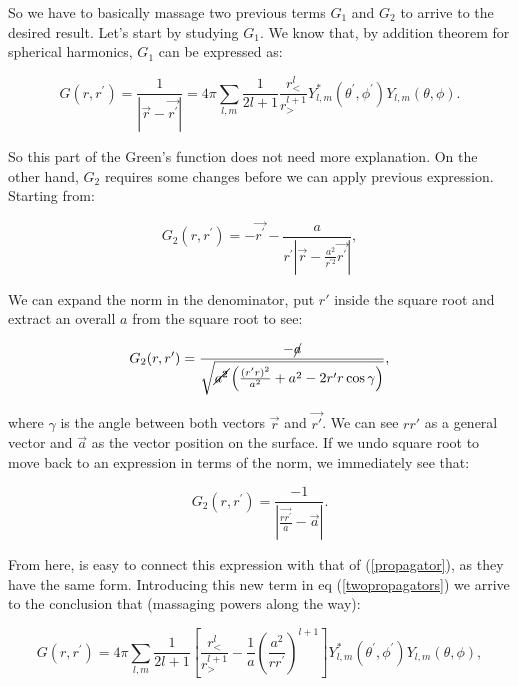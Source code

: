 So we have to basically massage two previous terms $G_{1}$ and $G_{2}$ to arrive to the desired result. Let's start by studying $G_{1}$.  We know that, by addition theorem for spherical harmonics, $G_{1}$ can be expressed as:
	
\begin{equation}\label{propagator}
	G\left(r, r^{\prime}\right) = \frac{1}{\left|\vec{r}-\vec{r^{\prime}}\right|}=4 \pi \sum_{l, m} \frac{1}{2 l+1}\frac{r_{<}^{l}}{r_{>}^{l+1}} Y_{l, m}^{*}\left(\theta^{\prime}, \phi^{\prime}\right) Y_{l, m}(\theta, \phi).
\end{equation}

So this part of the Green's function does not need more explanation. On the other hand, $G_{2}$ requires some changes before we can apply previous expression. Starting from:
	
\begin{equation}
	G_{2} (r, r^{\prime}) = -\vec{r^{\prime}}-\frac{a}{r^{\prime}\left|\vec{r}-\frac{a^{2}}{r^{\prime 2}} \vec{r^{\prime}}\right|},
\end{equation}

We can expand the norm in the denominator, put $r'$ inside the square root and extract an overall $a$ from the square root to see:
	
\begin{equation}
	G_{2} (r, r^{\prime})= \frac{-\cancel{a}}{\sqrt{\cancel{a^{2}}\left(\tfrac{(r'r)^{2}}{a^{2}} + a^{2} -2 r' r \cos \gamma\right)}},
\end{equation}

where $\gamma$ is the angle between both vectors $\vec{r}$ and $\vec{r'}$. We can see $r r'$ as a general vector and $\vec{a}$ as the vector position on the surface. If we undo square root to move back to an expression in terms of the norm, we immediately see that:
	
\begin{equation}
	G_{2} (r, r^{\prime})= \frac{-1}{\left|\tfrac{\vec{r r^{\prime}}}{a}-\vec{a}\right|}.
\end{equation}

From here, is easy to connect this expression with that of (\ref{propagator}), as they have the same form. Introducing this new term in eq (\ref{twopropagators}) we arrive to the conclusion that (massaging powers along the way):
	
\begin{equation}
	G\left(r, r^{\prime}\right)=4 \pi \sum_{l, m} \frac{1}{2 l+1}\left[\frac{r_{<}^{l}}{r_{>}^{l+1}}-\frac{1}{a}\left(\frac{a^{2}}{r r^{\prime}}\right)^{l+1}\right] Y_{l, m}^{*}\left(\theta^{\prime}, \phi^{\prime}\right) Y_{l, m}(\theta, \phi),
\end{equation}

